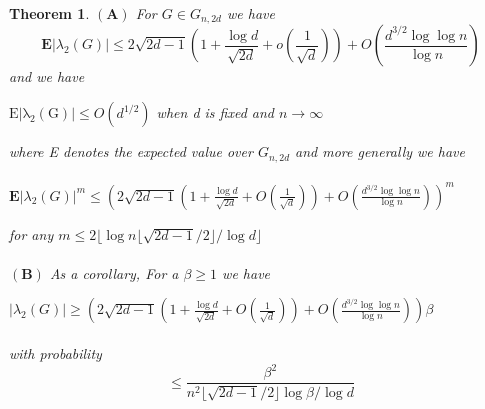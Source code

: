 \documentclass[oneside]{book}
\newtheorem{theorem}{Theorem}[section]
\begin{document}
	
	\begin{theorem} \label{t:13}
		$ \left(\mathbf{A} \right) $ For $G \in{G}_{n, 2d}$ we have
		$$
		\mathbf{E}\left|\lambda_{2}(G)\right| \leq 2 \sqrt{2 d-1}\left(1+\frac{\log d}{\sqrt{2 d}}+o\left(\frac{1}{\sqrt{d}}\right)\right)+O\left(\frac{d^{3 / 2} \log \log n}{\log n}\right)
		$$  and we have \begin{center}
			$\mathrm{E|\lambda_{2}(G)|} \leq O(d^{1/2})$ when d is fixed and $n\rightarrow \infty$
		\end{center}
		where E denotes the expected
		value over ${G}_{n, 2d}$      and more generally we have\\\\ $\mathbf{E}\left|\lambda_{2}(G)\right|^{m} \leq\left(2 \sqrt{2 d-1}\left(1+\frac{\log d}{\sqrt{2 d}}+O\left(\frac{1}{\sqrt{d}}\right)\right)+O\left(\frac{d^{3 / 2} \log \log n}{\log n}\right)\right)^{m}$ \par
		for any $ m \leq 2\lfloor\log n\lfloor\sqrt{2 d-1} / 2\rfloor / \log d\rfloor$\\\\
		$ \left(\mathbf{B}\right) $   As a corollary, For a $\beta\geq 1$ we have \par
		$\left|\lambda_{2}(G)\right| \geq\left(2 \sqrt{2 d-1}\left(1+\frac{\log d}{\sqrt{2 d}}+O\left(\frac{1}{\sqrt{d}}\right)\right)+O\left(\frac{d^{3 / 2} \log \log n}{\log n}\right)\right) \beta$\\\\
		with probability
		$$
		\leq \frac{\beta^{2}}{n^{2}\lfloor\sqrt{2 d-1} / 2\rfloor \log \beta / \log d}
		$$   \\\\
	\end{theorem}
\end{document}
